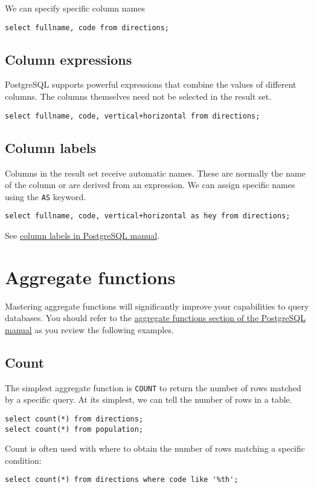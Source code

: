 \documentclass{pgnotes}
\begin{document}
We can specify specific column names
\begin{verbatim}
select fullname, code from directions;
\end{verbatim}

\subsection{Column expressions}

PostgreSQL supports powerful expressions that combine the values of different columns.
The columns themselves need not be selected in the result set.
\begin{verbatim}
select fullname, code, vertical+horizontal from directions;
\end{verbatim}

\subsection{Column labels}

Columns in the result set receive automatic names.
These are normally the name of the column or are derived from an expression.
We can assign specific names using the \texttt{AS} keyword.
\begin{verbatim}
select fullname, code, vertical+horizontal as hey from directions;
\end{verbatim}
See \href{https://www.postgresql.org/docs/13/queries-select-lists.html#QUERIES-COLUMN-LABELS}{column labels in PostgreSQL manual}.

\section{Aggregate functions}

Mastering aggregate functions will significantly improve your capabilities to query databases.
You should refer to the \href{https://www.postgresql.org/docs/13/functions-aggregate.html}{aggregate functions section of the PostgreSQL manual} as you review the following examples.

\subsection{Count}

The simplest aggregate function is \texttt{COUNT} to return the number of rows matched by a specific query.
At its simplest, we can tell the number of rows in a table. 

\begin{verbatim}
select count(*) from directions;
select count(*) from population; 
\end{verbatim}

Count is often used with where to obtain the number of rows matching a specific condition:
\begin{verbatim}
select count(*) from directions where code like '%th'; 
\end{verbatim}
\end{document}

